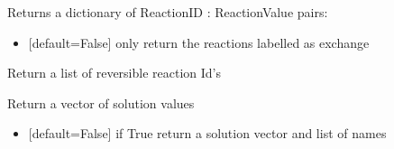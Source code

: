 \documentclass[letterpaper,10pt,english]{sphinxmanual}
\begin{document}
\begin{fulllineitems}
\begin{fulllineitems}
\begin{itemize}
\end{itemize}

\end{fulllineitems}


\begin{fulllineitems}
\label{\detokenize{modules_doc:cbmpy.CBModel.Model.getReactionValues}}
\pysigstartsignatures
{}
\pysigstopsignatures
\sphinxAtStartPar
Returns a dictionary of ReactionID : ReactionValue pairs:
\begin{itemize}
\item {} 
\sphinxAtStartPar
{} {[}default=False{]} only return the reactions labelled as exchange

\end{itemize}

\end{fulllineitems}


\begin{fulllineitems}
\label{\detokenize{modules_doc:cbmpy.CBModel.Model.getReversibleReactionIds}}
\pysigstartsignatures
{}
\pysigstopsignatures
\sphinxAtStartPar
Return a list of reversible reaction Id’s

\end{fulllineitems}


\begin{fulllineitems}
\label{\detokenize{modules_doc:cbmpy.CBModel.Model.getSolutionVector}}
\pysigstartsignatures
{}
\pysigstopsignatures
\sphinxAtStartPar
Return a vector of solution values
\begin{itemize}
\item {} 
\sphinxAtStartPar
{} {[}default=False{]} if True return a solution vector and list of names


\end{itemize}
\end{fulllineitems}
\end{fulllineitems}
\end{document}
